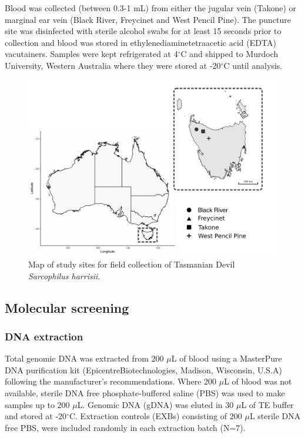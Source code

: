 \documentclass[a4paper, nobind]{templates/ociamthesis}
\begin{document}
Blood was collected (between 0.3-1 mL) from either the jugular vein (Takone) or marginal ear vein (Black River, Freycinet and West Pencil Pine). The puncture site was disinfected with sterile alcohol swabs for at least 15 seconds prior to collection and blood was stored in ethylenediaminetetraacetic acid (EDTA) vacutainers. Samples were kept refrigerated at 4\(^\circ\)C and shipped to Murdoch University, Western Australia where they were stored at -20\(^\circ\)C until analysis.

\begin{figure}
\includegraphics[width=0.95\linewidth]{figures/ms-figs/Ch6-Fig1} \caption[Map of study sites for Tasmanian devil.]{Map of study sites for field collection of Tasmanian Devil \textit{Sarcophilus harrisii}.}\label{fig:F61}
\end{figure}

\hypertarget{molecular-screening}{%
\subsection{Molecular screening}\label{molecular-screening}}

\hypertarget{dna-extraction}{%
\subsubsection{DNA extraction}\label{dna-extraction}}

Total genomic DNA was extracted from 200 \(\mu\)L of blood using a MasterPure DNA purification kit (Epicentre\textregistered Biotechnologies, Madison, Wisconsin, U.S.A) following the manufacturer's recommendations. Where 200 \(\mu\)L of blood was not available, sterile DNA free phosphate-buffered saline (PBS) was used to make samples up to 200 \(\mu\)L. Genomic DNA (gDNA) was eluted in 30 \(\mu\)L of TE buffer and stored at -20\(^\circ\)C. Extraction controls (EXBs) consisting of 200 \(\mu\)L sterile DNA free PBS, were included randomly in each extraction batch (N=7).
\end{document}
